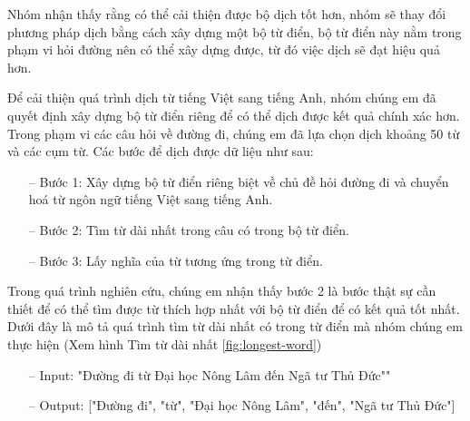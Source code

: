 \begin{enumerate}
          Nhóm nhận thấy rằng có thể cải thiện được bộ dịch tốt hơn, nhóm sẽ thay đổi phương pháp dịch bằng cách xây dựng một bộ từ điển, bộ từ điển này nằm trong phạm vi hỏi đường nên có thể xây dựng được, từ đó việc dịch sẽ đạt hiệu quả hơn.
          
          Để cải thiện quá trình dịch từ tiếng Việt sang tiếng Anh, nhóm chúng em đã quyết định xây dựng bộ từ điển riêng để có thể dịch được kết quả chính xác hơn.
          Trong phạm vi các câu hỏi về đường đi, chúng em đã lựa chọn dịch khoảng 50 từ và các cụm từ. Các bước để dịch được dữ liệu như sau:
          \begin{itemize}
              \item[--] Bước 1: Xây dựng bộ từ điển riêng biệt về chủ đề hỏi đường đi và chuyển hoá từ ngôn ngữ tiếng Việt sang tiếng Anh.
              \item[--] Bước 2: Tìm từ dài nhất trong câu có trong bộ từ điển.
              \item[--] Bước 3: Lấy nghĩa của từ tương ứng trong từ điển.
          \end{itemize}
          Trong quá trình nghiên cứu, chúng em nhận thấy bước 2 là bước thật sự cần thiết để có thể tìm được từ thích hợp nhất với bộ từ điển để có kết quả tốt nhất. Dưới đây là mô tả quá trình tìm từ dài nhất có trong từ điển mà nhóm chúng em thực hiện (Xem hình Tìm từ dài nhất \ref{fig:longest-word})
          \begin{itemize}
              \item[--] Input: "Đường đi từ Đại học Nông Lâm đến Ngã tư Thủ Đức""
              \item[--] Output: ["Đường đi", "từ", "Đại học Nông Lâm", "đến", "Ngã tư Thủ Đức"]
          \end{itemize}
          \begin{figure}[htp]
              \centering

\end{figure}
\end{enumerate}

